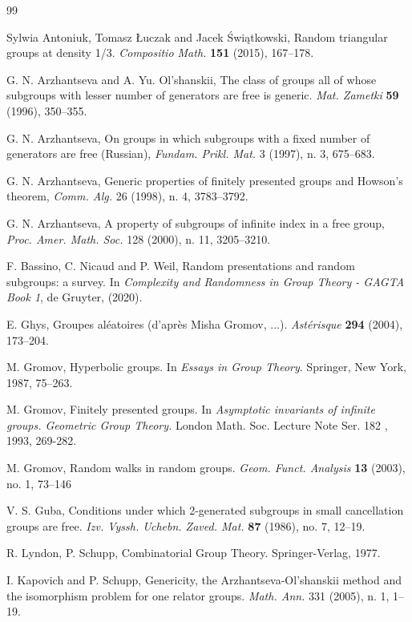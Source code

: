 \documentclass{article}
\theoremstyle{remark}
\begin{document}
\begin{thebibliography}{99}

 Sylwia Antoniuk, Tomasz Łuczak and Jacek Świątkowski, 
    Random triangular groups at density 1/3. \textit{Compositio Math.} \textbf{151} (2015), 167–178.

 G. N. Arzhantseva and A. Yu. Ol'shanskii,
    The class of groups all of whose subgroups with lesser number of generators are free is generic.
    \textit{Mat. Zametki} \textbf{59} (1996), 350–355.
    
 G. N. Arzhantseva,
    On groups in which subgroups with a fixed number of generators are free (Russian), \textit{Fundam. Prikl. Mat.} 3 (1997), n. 3, 675–683.

 G. N. Arzhantseva, 
    Generic properties of finitely presented groups and Howson’s theorem, \textit{Comm. Alg.} 26 (1998), n. 4, 3783–3792.

 G. N. Arzhantseva,
    A property of subgroups of infinite index in a free group, \textit{Proc. Amer. Math. Soc.} 128 (2000), n. 11, 3205–3210.

 F. Bassino, C. Nicaud and P. Weil,
    Random presentations and random subgroups: a survey. 
    In \textit{Complexity and Randomness in Group Theory - GAGTA Book 1}, de Gruyter, (2020).
    
 E. Ghys,
    Groupes aléatoires (d’après Misha Gromov, ...).
    \textit{Astérisque} \textbf{294} (2004), 173–204.

 M. Gromov, 
    Hyperbolic groups. In \textit{Essays in Group Theory}.
    Springer, New York, 1987, 75–263.

 M. Gromov, 
    Finitely presented groups. In  \textit{Asymptotic invariants of infinite groups. Geometric Group Theory.}
    London Math. Soc. Lecture Note Ser. 182 , 1993, 269-282.

 M. Gromov,
    Random walks in random groups.
    \textit{Geom. Funct. Analysis} \textbf{13} (2003), no. 1, 73–146

 V. S. Guba,
    Conditions under which 2-generated subgroups in small cancellation groups are free.
    \textit{Izv. Vyssh. Uchebn. Zaved. Mat.} \textbf{87} (1986), no. 7, 12–19.

 R. Lyndon, P. Schupp,
    Combinatorial Group Theory. 
    Springer-Verlag, 1977.

 I. Kapovich and P. Schupp, 
    Genericity, the Arzhantseva-Ol’shanskii method and the isomorphism problem for one relator groups. \textit{Math. Ann.} 331 (2005), n. 1, 1–19.


\end{thebibliography}
\end{document}

